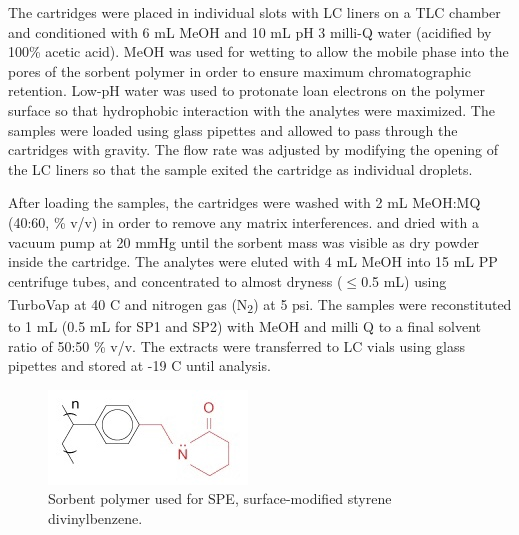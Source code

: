 The cartridges were placed in individual slots with LC liners on a TLC chamber and conditioned with 6 mL MeOH and 10 mL pH 3 milli-Q water (acidified by 100\% acetic acid). MeOH was used for wetting to allow the mobile phase into the pores of the sorbent polymer in order to ensure maximum chromatographic retention. Low-pH water was used to protonate loan electrons on the polymer surface so that hydrophobic interaction with the analytes were maximized. The samples were loaded using glass pipettes and allowed to pass through the cartridges with gravity. The flow rate was adjusted by modifying the opening of the LC liners so that the sample exited the cartridge as individual droplets. 

After loading the samples, the cartridges were washed with 2 mL MeOH:MQ (40:60, \% v/v) in order to remove any matrix interferences.  and dried with a vacuum pump at 20 mmHg until the sorbent mass was visible as dry powder inside the cartridge. The analytes were eluted with 4 mL MeOH into 15 mL PP centrifuge tubes, and concentrated to almost dryness ($\le$0.5 mL) using TurboVap\textsuperscript{\textregistered} at 40 \textdegree C and nitrogen gas (N\textsubscript{2}) at 5 psi. The samples were reconstituted to 1 mL (0.5 mL for SP1 and SP2) with MeOH and milli Q to a final solvent ratio of 50:50 \% v/v. The extracts were transferred to LC vials using glass pipettes and stored at -19 \textdegree C until analysis.

\begin{figure}
    \centering
    \includegraphics{Bilder/SPE_LCMS/mg_spe_strata-x.jpg}
    \caption{Sorbent polymer used for SPE, surface-modified styrene divinylbenzene.}
    \label{fig:StatPhase}
\end{figure}

